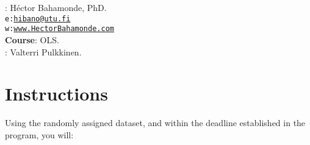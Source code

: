 \documentclass[10pt]{article}
\begin{document}


\thispagestyle{fancy} %





\hspace{-5mm}{\bf Professor}: H\'ector Bahamonde, PhD.\\
\texttt{e:}\href{mailto:hibano@utu.fi}{\texttt{hibano@utu.fi}}\\
\texttt{w:}\href{http://www.hectorbahamonde.com}{\texttt{www.HectorBahamonde.com}}\\
{\bf Course}: OLS.\\
\hspace{-5mm}{\bf TA}: Valterri Pulkkinen.


\vspace{-0.8cm}
\section*{Instructions}

Using the randomly assigned dataset, and within the deadline established in the program, you will:
\end{document}
